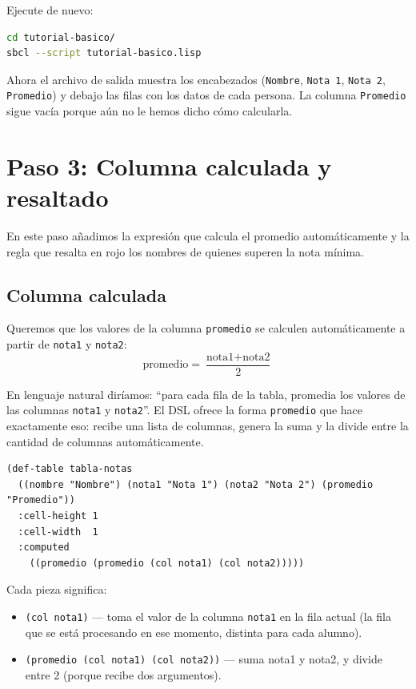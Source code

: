\documentclass[12pt,a4paper]{report}
\begin{document}
Ejecute de nuevo:

\begin{lstlisting}[language=bash, numbers=none, backgroundcolor=\color{gray!10},
                   basicstyle=\ttfamily\small]
cd tutorial-basico/
sbcl --script tutorial-basico.lisp
\end{lstlisting}

Ahora el archivo de salida muestra los encabezados (\texttt{Nombre},
\texttt{Nota 1}, \texttt{Nota 2}, \texttt{Promedio}) y debajo las filas
con los datos de cada persona.  La columna \texttt{Promedio} sigue vacía
porque aún no le hemos dicho cómo calcularla.

\section{Paso 3: Columna calculada y resaltado}

En este paso añadimos la expresión que calcula el promedio automáticamente
y la regla que resalta en rojo los nombres de quienes superen la nota
mínima.

\subsection{Columna calculada}

Queremos que los valores de la columna \texttt{promedio} se calculen
automáticamente a partir de \texttt{nota1} y \texttt{nota2}:
\[
\text{promedio} = \frac{\text{nota1} + \text{nota2}}{2}
\]

En lenguaje natural diríamos: ``para cada fila de la tabla, promedia
los valores de las columnas \texttt{nota1} y \texttt{nota2}''.  El DSL
ofrece la forma \texttt{promedio} que hace exactamente eso: recibe una
lista de columnas, genera la suma y la divide entre la cantidad de
columnas automáticamente.

\begin{lstlisting}[caption={Tabla con columna calculada.}]
(def-table tabla-notas
  ((nombre "Nombre") (nota1 "Nota 1") (nota2 "Nota 2") (promedio "Promedio"))
  :cell-height 1
  :cell-width  1
  :computed
    ((promedio (promedio (col nota1) (col nota2)))))
\end{lstlisting}

\noindent Cada pieza significa:

\begin{itemize}
  \item \texttt{(col nota1)} --- toma el valor de la columna
    \texttt{nota1} en la fila actual (la fila que se está procesando
    en ese momento, distinta para cada alumno).
  \item \texttt{(promedio (col nota1) (col nota2))} --- suma nota1 y
    nota2, y divide entre 2 (porque recibe dos argumentos).
\end{itemize}
\end{document}
